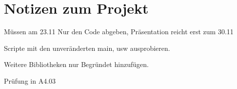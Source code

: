 \documentclass[a4paper]{article}
\begin{document}

\section{Notizen zum Projekt}

Müssen am 23.11 Nur den Code abgeben, Präsentation reicht erst zum 30.11

Scripte mit den unveränderten main, usw ausprobieren.

Weitere Bibliotheken nur Begründet hinzufügen.

Prüfung in A4.03
\end{document}
